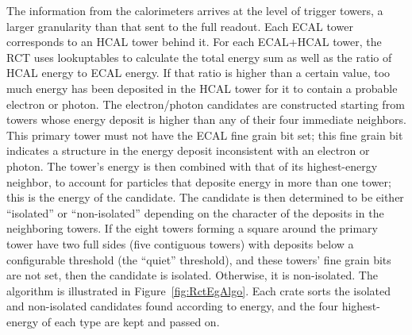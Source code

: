 The information from the calorimeters arrives at the level of trigger towers, 
a larger granularity than that sent to the full readout.  
Each ECAL tower corresponds to an HCAL tower behind it.  
For each ECAL+HCAL tower, the RCT uses lookuptables to 
calculate the total energy sum 
as well as the ratio of HCAL energy to ECAL energy.  
If that ratio is higher than a certain value, 
too much energy has been deposited in the HCAL tower for it to 
contain a probable electron or photon.  
The electron/photon candidates are constructed starting from 
towers whose energy deposit is higher than any of their 
four immediate neighbors.  
This primary tower must not have the ECAL fine grain bit set; 
this fine grain bit indicates a structure in the energy deposit 
inconsistent with an electron or photon.  
The tower's energy is then combined with that of its highest-energy 
neighbor, to account for particles that deposite energy 
in more than one tower; 
this is the energy of the candidate.  
The candidate is then determined to be either ``isolated'' or 
``non-isolated'' depending on the character of the deposits 
in the neighboring towers.  
If the eight towers forming a square around the primary tower 
have two full sides (five contiguous towers) with 
deposits below a configurable threshold (the ``quiet'' threshold), 
and these towers' fine grain bits are not set, 
then the candidate is isolated.  
Otherwise, it is non-isolated.  
The algorithm is illustrated in Figure~\ref{fig:RctEgAlgo}.  
Each crate sorts the isolated and non-isolated candidates found 
according to energy, 
and the four highest-energy of each type are kept and passed on.  

